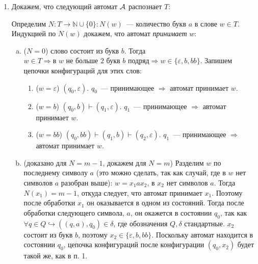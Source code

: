 \documentclass[a4paper]{article}
\begin{document}
\begin{enumerate}[1.]
\begin{enumerate}[1.]
\begin{enumerate}[a.]
\end{enumerate}
\end{enumerate}
\item Докажем, что следующий автомат ${\cal A}$ распознает $T$:
\newline
{}
\newline
Определим $N:T\longrightarrow {\mathbb N} \cup \{0\}:N(w)$~--- количество букв $a$ в слове $w\in T$. Индукцией по $N(w)$ докажем, что автомат \emph{принимает} $w$:
\begin{enumerate}[a.]
\item ($N=0$) слово состоит из букв $b$. Тогда $w\in T\Rightarrow\text{в }w\text{ не больше }2\text{ букв }b\text{ подряд}\Rightarrow w\in\{\varepsilon,b,bb\}$. Запишем цепочки конфигураций для этих слов:
\begin{enumerate}[1.]
\item ($w=\varepsilon$) $(q_0,\varepsilon)$. $q_0$~--- принимающее $\Rightarrow$ автомат принимает $w$.
\item ($w=b$) $(q_0,b)\vdash(q_1,\varepsilon)$. $q_1$~--- принимающее $\Rightarrow$ автомат принимает $w$.
\item ($w=bb$) $(q_0,bb)\vdash(q_1,b)\vdash(q_2,\varepsilon)$. $q_1$~--- принимающее $\Rightarrow$ автомат принимает $w$.
\end{enumerate}
\item (доказано для $N=m-1$, докажем для $N=m$) Разделим $w$ по последнему символу $a$ (это можно сделать, так как случай, где в $w$ нет символов $a$ разобран выше): $w=x_1ax_2$, в $x_2$ нет символов $a$. Тогда $N(x_1)=m-1$, откуда следует, что автомат принимает $x_1$. Поэтому после обработки $x_1$ он оказывается в одном из состояний. Тогда после обработки следующего символа, $a$, он окажется в состоянии $q_0$, так как $\forall q\in Q\hookrightarrow ((q,a),q_0)\in \delta$, где обозначения $Q,\delta$ стандартные.\newline
$x_2$ состоит из букв $b$, поэтому $x_2\in \{\varepsilon,b,bb\}$. Поскольку автомат находится в состоянии $q_0$, цепочка конфигураций после конфигурации $(q_0,x_2)$ будет такой же, как в п. 1.

\end{enumerate}
\end{enumerate}
\end{document}
